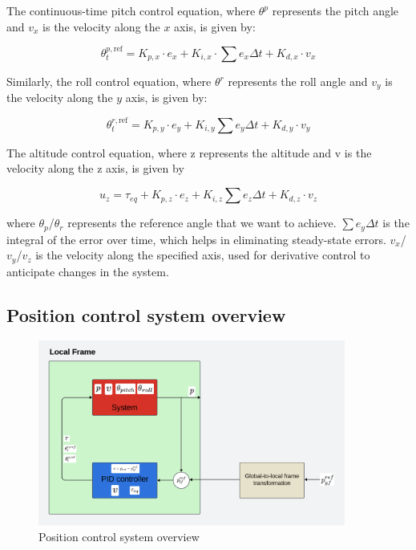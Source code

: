 \documentclass{report}
\begin{document}
The continuous-time pitch control equation, where \( \theta^p \) represents the pitch angle and \( v_x \) is the velocity along the \(x\) axis, is given by:

\begin{equation}
  \theta^{p,\text{ref}}_t = K_{p,x} \cdot e_x + K_{i,x} \cdot \sum e_x \Delta t + K_{d,x} \cdot v_x
\end{equation}

Similarly, the roll control equation, where \( \theta^r \) represents the roll angle and \( v_y \) is the velocity along the \(y\) axis, is given by:

\begin{equation}
  \theta^{r,\text{ref}}_t = K_{p,y} \cdot e_y + K_{i,y} \sum e_y \Delta t + K_{d,y} \cdot v_y
\end{equation}

The altitude control equation, where z represents the altitude and v  is the velocity along the z
axis, is given by

\begin{equation}
  u_z = \tau_{eq} + K_{p,z} \cdot e_z + K_{i,z} \sum e_z \Delta t + K_{d,z} \cdot v_z
\end{equation}

where \(\theta_p\)/\(\theta_r\) represents the reference angle that we want to achieve. \(\sum e_y \Delta t\) is the integral of the error over time, which helps in eliminating steady-state errors. \(v_x\)/\(v_y\)/\(v_z\) is the velocity along the specified axis, used for derivative control to anticipate changes in the system.

\subsection{Position control system overview}
\begin{figure}[H]
  \centering
  \includegraphics[width=0.9\textwidth]{Pictures/position_control_system_flowchart.png}
  \caption{Position control system overview}
  \label{fig:position_control_system_flowchart}
\end{figure}
\end{document}
